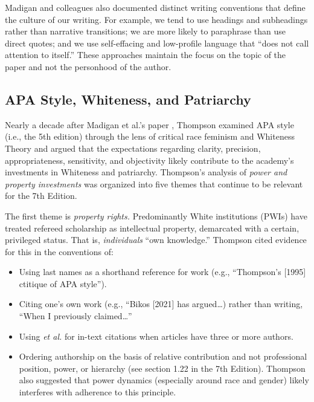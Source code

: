 \documentclass[
  11pt,
]{book}
\providecommand{\tightlist}{%
  \setlength{\itemsep}{0pt}\setlength{\parskip}{0pt}}
\begin{document}
Madigan \citep{madigan_language_1995} and colleagues also documented distinct writing conventions that define the culture of our writing. For example, we tend to use headings and subheadings rather than narrative transitions; we are more likely to paraphrase than use direct quotes; and we use self-effacing and low-profile language that ``does not call attention to itself.'' These approaches maintain the focus on the topic of the paper and not the personhood of the author.

\subsection{APA Style, Whiteness, and Patriarchy}\label{apa-style-whiteness-and-patriarchy}

Nearly a decade after Madigan et al.'s paper \citeyearpar{madigan_language_1995}, Thompson \citeyearpar{thompson_gentlemanly_2004} examined APA style (i.e., the 5th edition) through the lens of critical race feminism and Whiteness Theory and argued that the expectations regarding clarity, precision, appropriateness, sensitivity, and objectivity likely contribute to the academy's investments in Whiteness and patriarchy. Thompson's analysis of \emph{power and property investments} was organized into five themes that continue to be relevant for the 7th Edition.

The first theme is \emph{property rights.} Predominantly White institutions (PWIs) have treated refereed scholarship as intellectual property, demarcated with a certain, privileged status. That is, \emph{individuals} ``own knowledge.'' Thompson \citeyearpar{thompson_gentlemanly_2004} cited evidence for this in the conventions of:

\begin{itemize}
\tightlist
\item
  Using last names as a shorthand reference for work (e.g., ``Thompson's {[}1995{]} ctitique of APA style'').
\item
  Citing one's own work (e.g., ``Bikos {[}2021{]} has argued\ldots) rather than writing, ``When I previously claimed\ldots''
\item
  Using \emph{et al.} for in-text citations when articles have three or more authors.
\item
  Ordering authorship on the basis of relative contribution and not professional position, power, or hierarchy (see section 1.22 in the 7th Edition). Thompson \citeyearpar{thompson_gentlemanly_2004} also suggested that power dynamics (especially around race and gender) likely interferes with adherence to this principle.
\end{itemize}
\end{document}
